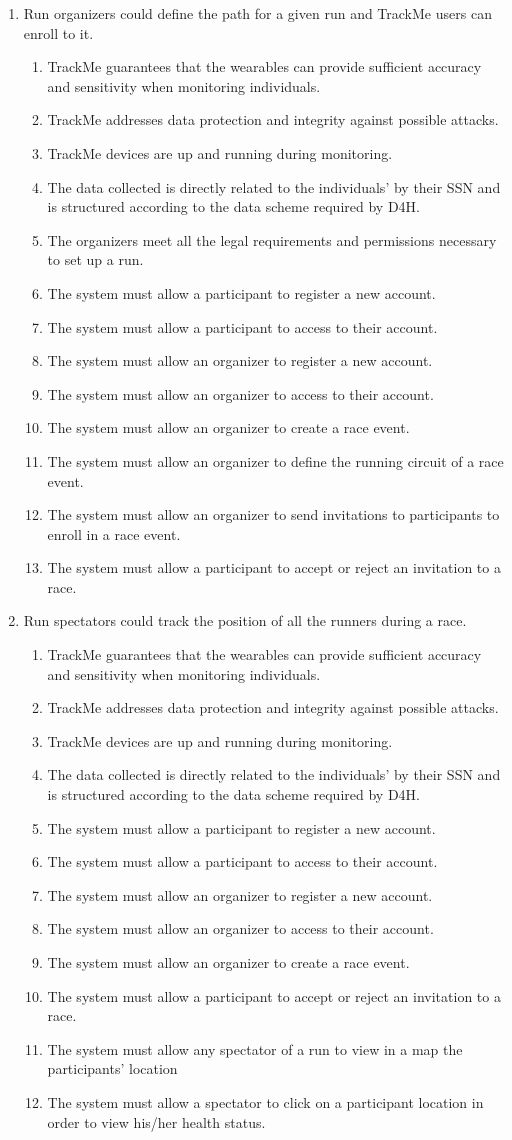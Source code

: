 \documentclass[a4paper, hidelinks, 12pt]{report}
\newcommand\requirement[1]{\item[{[R#1]}] }
\newcommand\goal[1]{\item[{[G#1]}] }
\newcommand\assumption[1]{\item[{[D#1]}] }
\begin{document}
\begin{enumerate}
		\goal{6} Run organizers could define the path for a given run and TrackMe users can enroll to it.
		\begin{enumerate}
			\assumption{1} TrackMe guarantees that the wearables can provide sufficient accuracy and sensitivity when monitoring individuals.
			\assumption{2} TrackMe addresses data protection and integrity against possible attacks.
			\assumption{3} TrackMe devices are up and running during monitoring.
			\assumption{4} The data collected is directly related to the individuals' by their SSN and is structured according to the data scheme required by D4H.
			\assumption{7} The organizers meet all the legal requirements and permissions necessary to set up a run.
			\requirement{16} The system must allow a participant to register a new account.
			\requirement{17} The system must allow a participant to access to their account.
			\requirement{18} The system must allow an organizer to register a new account.
			\requirement{19} The system must allow an organizer to access to their account.
			\requirement{20} The system must allow an organizer to create a race event.
			\requirement{21} The system must allow an organizer to define the running circuit of a race event.
			\requirement{22} The system must allow an organizer to send invitations to participants to enroll in a race event.
			\requirement{23} The system must allow a participant to accept or reject an invitation to a race.
		\end{enumerate}
		
		\goal{7} Run spectators could track the position of all the runners during a race.
		\begin{enumerate}
			\assumption{1} TrackMe guarantees that the wearables can provide sufficient accuracy and sensitivity when monitoring individuals.
			\assumption{2} TrackMe addresses data protection and integrity against possible attacks.
			\assumption{3} TrackMe devices are up and running during monitoring.
			\assumption{4} The data collected is directly related to the individuals' by their SSN and is structured according to the data scheme required by D4H.
			\requirement{16} The system must allow a participant to register a new account.
			\requirement{17} The system must allow a participant to access to their account.
			\requirement{18} The system must allow an organizer to register a new account.
			\requirement{19} The system must allow an organizer to access to their account.
			\requirement{20} The system must allow an organizer to create a race event.
			\requirement{23} The system must allow a participant to accept or reject an invitation to a race.
			\requirement{24} The system must allow any spectator of a run to view in a map the participants' location
			\requirement{25} The system must allow a spectator to click on a participant location in order to view his/her health status.
		\end{enumerate}
		
	\end{enumerate}
	
\end{document}
